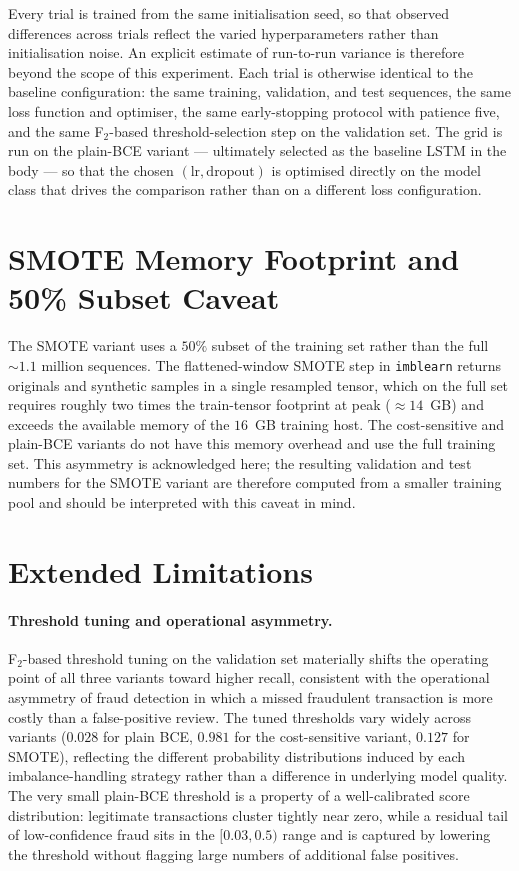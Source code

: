 \documentclass[oneside,12pt,parskip=half,american,numbers=noenddot]{scrreprt}
\begin{document}
Every trial is trained from the same initialisation seed, so that observed differences across trials reflect the varied hyperparameters rather than initialisation noise. An explicit estimate of run-to-run variance is therefore beyond the scope of this experiment. Each trial is otherwise identical to the baseline configuration: the same training, validation, and test sequences, the same loss function and optimiser, the same early-stopping protocol with patience five, and the same F\(_2\)-based threshold-selection step on the validation set. The grid is run on the plain-BCE variant — ultimately selected as the baseline LSTM in the body — so that the chosen $(\text{lr}, \text{dropout})$ is optimised directly on the model class that drives the comparison rather than on a different loss configuration.


\section{SMOTE Memory Footprint and 50\% Subset Caveat}
\label{app:smote_mem}

The SMOTE variant uses a $50\%$ subset of the training set rather than the full $\sim 1.1$ million sequences. The flattened-window SMOTE step in \texttt{imblearn} returns originals and synthetic samples in a single resampled tensor, which on the full set requires roughly two times the train-tensor footprint at peak ($\approx 14$~GB) and exceeds the available memory of the $16$~GB training host. The cost-sensitive and plain-BCE variants do not have this memory overhead and use the full training set. This asymmetry is acknowledged here; the resulting validation and test numbers for the SMOTE variant are therefore computed from a smaller training pool and should be interpreted with this caveat in mind.


\section{Extended Limitations}
\label{app:limitations}

\paragraph{Threshold tuning and operational asymmetry.} F\(_2\)-based threshold tuning on the validation set materially shifts the operating point of all three variants toward higher recall, consistent with the operational asymmetry of fraud detection in which a missed fraudulent transaction is more costly than a false-positive review. The tuned thresholds vary widely across variants ($0.028$ for plain BCE, $0.981$ for the cost-sensitive variant, $0.127$ for SMOTE), reflecting the different probability distributions induced by each imbalance-handling strategy rather than a difference in underlying model quality. The very small plain-BCE threshold is a property of a well-calibrated score distribution: legitimate transactions cluster tightly near zero, while a residual tail of low-confidence fraud sits in the $[0.03, 0.5)$ range and is captured by lowering the threshold without flagging large numbers of additional false positives.
\end{document}
